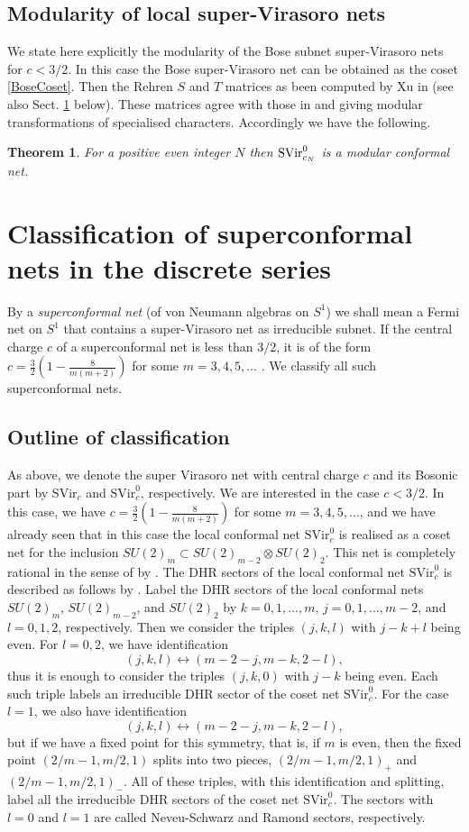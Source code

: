 \documentclass[11pt]{article}
\newtheorem{theorem}{Theorem}
\def\SVir{{\mathrm {SVir}}}
\begin{document}
\subsection{Modularity of local super-Virasoro nets}
%
We state here explicitly the modularity of the Bose subnet super-Virasoro nets for $c<3/2$. 
In this case the Bose super-Virasoro net can be obtained as the coset \eqref{BoseCoset}. 
Then the Rehren $S$ and $T$ matrices as been computed by Xu in \cite[Sect.2.2.]{X3} 
(see also Sect. \ref{classification} below). These matrices agree with those in \cite{GW} and 
\cite{FSS} giving modular transformations of specialised characters. Accordingly we have 
the following. 
%
\begin{theorem} 
For a positive even integer $N$ then ${\rm SVir}^0_{c_N}$ is a modular conformal net. 
\end{theorem}
%
\section{Classification of superconformal nets in the discrete series}
\label{classification}
By a \emph{superconformal net} (of von Neumann algebras on $S^1$) 
we shall mean a Fermi net on $S^1$ that contains
a super-Virasoro net as irreducible subnet.
If the central charge $c$ of a superconformal net
is less than $3/2$, it is of the form
$c=\displaystyle\frac{3}{2}\left(1-\frac{8}{m(m+2)}\right)$
for some $m=3,4,5,\dots$ \cite{FQS}.  We classify all such superconformal
nets.

\subsection{Outline of classification}
%
As above, we denote the super Virasoro net with central charge $c$
and its Bosonic part by $\SVir_c$ and $\SVir^0_c$, respectively.
We are interested in the case $c<3/2$.  In this case, we have
$c=\displaystyle\frac{3}{2}\left(1-\frac{8}{m(m+2)}\right)$
for some $m=3,4,5,\dots$, and we have already seen that in this case
the local conformal net $\SVir^0_c$ is realised as a coset
net for the inclusion $SU(2)_m\subset SU(2)_{m-2}\otimes SU(2)_2$.
This net is completely rational in the sense of \cite{KLM}
by \cite{X2}.  The DHR sectors of the local conformal net $\SVir^0_c$ is
described as follows by \cite[Section 2.2]{X3}.
Label the DHR sectors of the local conformal
nets $SU(2)_m$, $SU(2)_{m-2}$, and $SU(2)_2$ by $k=0,1,\dots, m$,
$j=0,1,\dots,m-2$, and $l=0,1,2$, respectively.  Then we consider the
triples $(j,k,l)$ with $j-k+l$ being even.
For $l=0,2$, we have identification
$$(j,k,l)\leftrightarrow(m-2-j,m-k,2-l),$$
thus it is enough to consider the triples $(j,k,0)$ with $j-k$
being even.  Each such triple labels an irreducible DHR sector
of the coset net $\SVir^0_c$.  For the case $l=1$, we also have
identification
$$(j,k,l)\leftrightarrow(m-2-j,m-k,2-l),$$
but if we have a fixed point for this symmetry, that is,
if $m$ is even, then the fixed point $(2/m-1, m/2,1)$ splits
into two pieces, $(2/m-1, m/2,1)_+$ and $(2/m-1, m/2,1)_-$.
All of these triples, with this identification
and splitting, label all the irreducible DHR sectors of
the coset net $\SVir^0_c$.  The sectors with $l=0$ and $l=1$
are called Neveu-Schwarz and Ramond sectors, respectively.
\end{document}
